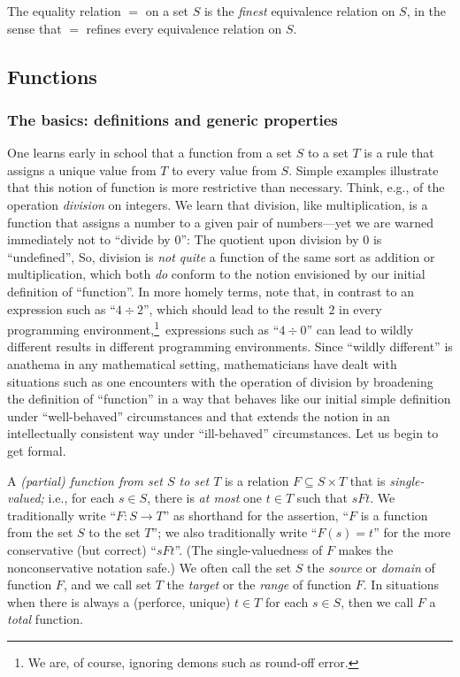 \begin{theorem}
\label{thm:equality=finest-equiv}
The equality relation $=$ on a set $S$ is the {\em finest} equivalence relation on $S$, in the sense that $=$ refines every equivalence relation on $S$.
\end{theorem}

\subsection{Functions}
\label{sec:function}

\subsubsection{The basics: definitions and generic properties}
\label{sec:basic-functions}

One learns early in school that a function from a set $S$ to a set $T$ is a rule that assigns a unique value from $T$ to every value from $S$.  Simple examples illustrate that this notion of function is more restrictive than necessary.  Think, e.g., of the operation {\em division} on integers.  We learn that division, like multiplication, is a function that assigns a number to a given pair of numbers---yet we are warned immediately not to ``divide by $0$'': The quotient upon division by $0$ is ``undefined'',  So, division is {\em not quite} a function of the same sort as addition or multiplication, which both {\em do} conform to the notion envisioned by our initial definition of ``function''.  In more homely terms, note that, in contrast to an expression such as ``$4 \div 2$'', which should lead to the result $2$ in every programming environment,\footnote{We are, of course, ignoring demons such as round-off error.}~expressions such as ``$4 \div 0$'' can lead to wildly different results in different programming environments.  Since ``wildly different'' is anathema in any mathematical setting, mathematicians have dealt with situations such as one encounters with the operation of division by broadening the definition of ``function'' in a way that behaves like our initial simple definition under ``well-behaved'' circumstances and that extends the notion in an intellectually consistent way under ``ill-behaved'' circumstances.  Let us begin to get formal.

\medskip

 
 
A {\it (partial) function from set $S$ to set $T$} is a relation $F \subseteq S \times T$ that is {\it single-valued;} i.e., for each $s \in S$, there is {\em at most} one $t \in T$ such that $sFt$.  We
traditionally write ``$F: S \rightarrow T$'' as shorthand for the assertion, ``$F$ is a function from the set $S$ to the set $T$''; we also traditionally write ``$F(s) = t$'' for the more conservative (but
correct) ``$sFt$''.  (The single-valuedness of $F$ makes the nonconservative notation safe.)  We often call the set $S$ the {\em source} or {\it domain} of function $F$, and we call set $T$ the {\em target} or the {\it range} of function $F$.  In situations when there is always a (perforce, unique) $t \in T$ for each $s \in S$, then we call $F$ a {\em total} function.


